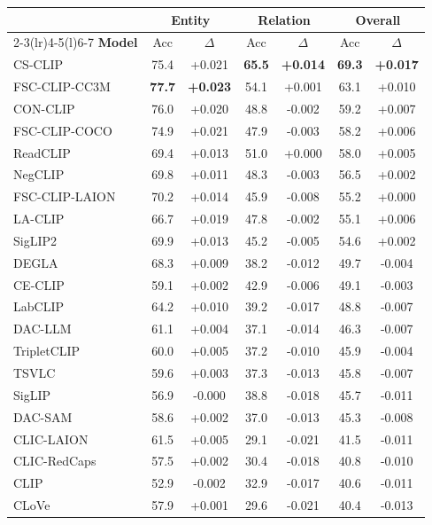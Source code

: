 \begin{tabular}{@{}l|cc|cc|cc@{}}
\toprule
& \multicolumn{2}{c|}{\textbf{Entity}} & \multicolumn{2}{c|}{\textbf{Relation}} & \multicolumn{2}{c}{\textbf{Overall}} \\
\cmidrule(r){2-3}\cmidrule(lr){4-5}\cmidrule(l){6-7}
\textbf{Model} & Acc & $\Delta$ & Acc & $\Delta$ & Acc & $\Delta$ \\
\midrule
CS-CLIP & 75.4 & +0.021 & \textbf{65.5} & \textbf{+0.014} & \textbf{69.3} & \textbf{+0.017} \\
FSC-CLIP-CC3M & \textbf{77.7} & \textbf{+0.023} & 54.1 & +0.001 & 63.1 & +0.010 \\
CON-CLIP & 76.0 & +0.020 & 48.8 & -0.002 & 59.2 & +0.007 \\
FSC-CLIP-COCO & 74.9 & +0.021 & 47.9 & -0.003 & 58.2 & +0.006 \\
ReadCLIP & 69.4 & +0.013 & 51.0 & +0.000 & 58.0 & +0.005 \\
NegCLIP & 69.8 & +0.011 & 48.3 & -0.003 & 56.5 & +0.002 \\
FSC-CLIP-LAION & 70.2 & +0.014 & 45.9 & -0.008 & 55.2 & +0.000 \\
LA-CLIP & 66.7 & +0.019 & 47.8 & -0.002 & 55.1 & +0.006 \\
SigLIP2 & 69.9 & +0.013 & 45.2 & -0.005 & 54.6 & +0.002 \\
DEGLA & 68.3 & +0.009 & 38.2 & -0.012 & 49.7 & -0.004 \\
CE-CLIP & 59.1 & +0.002 & 42.9 & -0.006 & 49.1 & -0.003 \\
LabCLIP & 64.2 & +0.010 & 39.2 & -0.017 & 48.8 & -0.007 \\
DAC-LLM & 61.1 & +0.004 & 37.1 & -0.014 & 46.3 & -0.007 \\
TripletCLIP & 60.0 & +0.005 & 37.2 & -0.010 & 45.9 & -0.004 \\
TSVLC & 59.6 & +0.003 & 37.3 & -0.013 & 45.8 & -0.007 \\
SigLIP & 56.9 & -0.000 & 38.8 & -0.018 & 45.7 & -0.011 \\
DAC-SAM & 58.6 & +0.002 & 37.0 & -0.013 & 45.3 & -0.008 \\
CLIC-LAION & 61.5 & +0.005 & 29.1 & -0.021 & 41.5 & -0.011 \\
CLIC-RedCaps & 57.5 & +0.002 & 30.4 & -0.018 & 40.8 & -0.010 \\
CLIP & 52.9 & -0.002 & 32.9 & -0.017 & 40.6 & -0.011 \\
CLoVe & 57.9 & +0.001 & 29.6 & -0.021 & 40.4 & -0.013 \\
\bottomrule
\end{tabular}